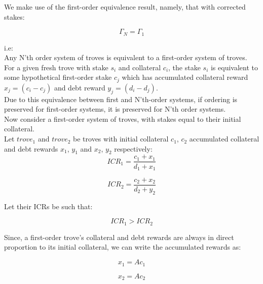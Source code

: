 \documentclass[reqno]{article}
\begin{document}
We make use of the first-order equivalence result, namely, that with corrected stakes:

\begin{equation} 
    \Gamma_N = \Gamma_1
\end{equation}

i.e:\\

Any N’th order system of troves is equivalent to a first-order system of troves. For a given fresh trove with stake $s_i$ and collateral $c_i$, the stake $s_i$ is equivalent to some hypothetical first-order stake $c_j$ which has accumulated collateral reward $x_j = (c_i - c_j)$ and debt reward $y_j = (d_i - d_j)$.\\

Due to this equivalence between first and N’th-order systems, if ordering is preserved for first-order systems, it is preserved for N’th order systems.\\

Now consider a first-order system of troves, with stakes equal to their initial collateral.\\

Let $trove_1$ and $trove_2$ be troves with initial collateral $c_1$, $c_2$ accumulated collateral and debt rewards $x_1$, $y_1$ and $x_2$, $y_2$ respectively:\\

\begin{equation} 
    ICR_1=\frac{c_1+x_1}{d_1+x_1}
\end{equation}

\begin{equation} 
    ICR_2=\frac{c_2+x_2}{d_2+y_2}
\end{equation}

Let their ICRs be such that:

\begin{equation} 
    ICR_1 > ICR_2
\end{equation}

\bigskip
Since, a first-order trove’s collateral and debt rewards are always in direct proportion to its initial collateral, we can write the accumulated rewards as:

\begin{equation} 
    x_1=Ac_1
\end{equation}

\begin{equation} 
    x_2=Ac_2
\end{equation}
\end{document}
